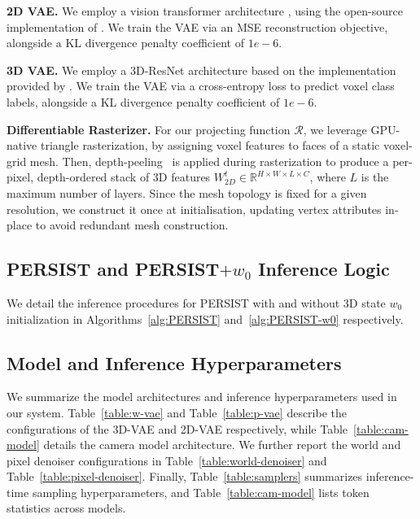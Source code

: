 \documentclass{article}
\theoremstyle{plain}
\theoremstyle{definition}
\theoremstyle{remark}
\begin{document}
\textbf{2D VAE.} We employ a vision transformer architecture \cite{dosovitskiy2020image}, using the open-source implementation of \cite{decart2024oasis}. We train the VAE via an MSE reconstruction objective, alongside a KL divergence penalty coefficient of $1e-6$.

\textbf{3D VAE.} We employ a 3D-ResNet architecture based on the implementation provided by \cite{xiang2024structured}. We train the VAE via a cross-entropy loss to predict voxel class labels, alongside a KL divergence penalty coefficient of $1e-6$.

\textbf{Differentiable Rasterizer.} For our projecting function $\mathcal{R}$, we leverage GPU-native triangle rasterization, by assigning voxel features to faces of a static voxel-grid mesh. Then, depth-peeling~\cite{bavoil2008order, nagy2003depth} is applied during rasterization to produce a per-pixel, depth-ordered stack of 3D features $W_{2D}^{t} \in \mathbb{R}^{H \times W \times L \times C}$, where $L$ is the maximum number of layers. Since the mesh topology is fixed for a given resolution, we construct it once at initialisation, updating vertex attributes in-place to avoid redundant mesh construction.  

\subsection{PERSIST and PERSIST$+w_0$ Inference Logic}
We detail the inference procedures for PERSIST with and without 3D state $w_0$ initialization in
Algorithms~\ref{alg:PERSIST} and~\ref{alg:PERSIST-w0} respectively.

\subsection{Model and Inference Hyperparameters}
We summarize the model architectures and inference hyperparameters used in our system. Table~\ref{table:w-vae} and Table~\ref{table:p-vae} describe the configurations of the 3D-VAE and 2D-VAE respectively, while Table~\ref{table:cam-model} details the camera model architecture. We further report the world and pixel denoiser configurations in Table~\ref{table:world-denoiser} and Table~\ref{table:pixel-denoiser}. Finally, Table~\ref{table:samplers} summarizes inference-time sampling hyperparameters, and Table~\ref{table:cam-model} lists token statistics across models.
\end{document}

